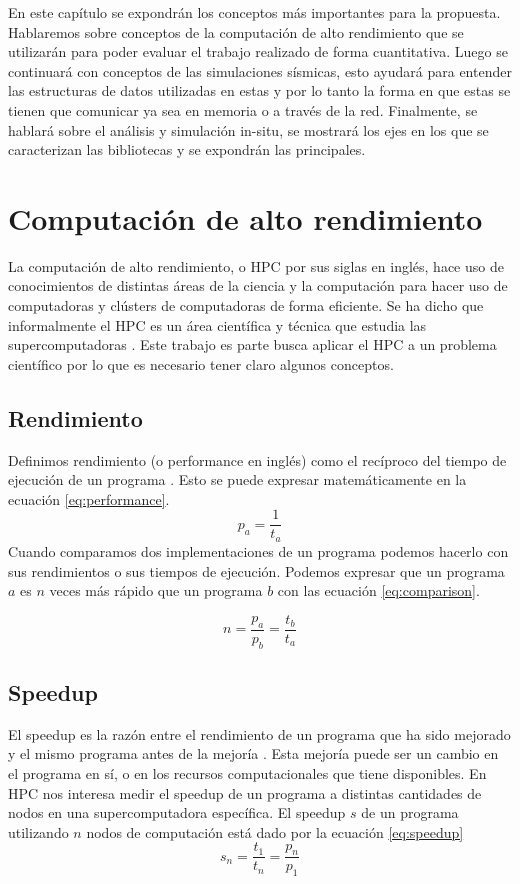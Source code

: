 En este capítulo se expondrán los conceptos más importantes para la propuesta. Hablaremos sobre conceptos de la computación de alto rendimiento que se utilizarán para poder evaluar el trabajo realizado de forma cuantitativa. Luego se continuará con conceptos de las simulaciones sísmicas, esto ayudará para entender las estructuras de datos utilizadas en estas y por lo tanto la forma en que estas se tienen que comunicar ya sea en memoria o a través de la red. Finalmente, se hablará sobre el análisis y simulación in-situ, se mostrará los ejes en los que se caracterizan las bibliotecas y se expondrán las principales.
\section{Computación de alto rendimiento}
La computación de alto rendimiento, o HPC por sus siglas en inglés, hace uso de conocimientos de distintas áreas de la ciencia y la computación para hacer uso de computadoras y clústers de computadoras de forma eficiente. Se ha dicho que informalmente el HPC es un área científica y técnica que estudia las supercomputadoras \cite{Nielsen2016}. Este trabajo es parte busca aplicar el HPC a un problema científico por lo que es necesario tener claro algunos conceptos.
\subsection{Rendimiento}
Definimos rendimiento (o performance en inglés) como el recíproco del tiempo de ejecución de un programa \cite{Hennessy2017-ml}. Esto se puede expresar matemáticamente en la ecuación \ref{eq:performance}.
\begin{equation}
  p_{a} = \frac{1}{t_a}
  \label{eq:performance}
\end{equation}
Cuando comparamos dos implementaciones de un programa podemos hacerlo con sus rendimientos o sus tiempos de ejecución. Podemos expresar que un programa $a$ es $n$ veces más rápido que un programa $b$ con las ecuación \ref{eq:comparison}.

\begin{equation}
  n = \frac{p_a}{p_b} = \frac{t_b}{t_a}
  \label{eq:comparison}
\end{equation}

\subsection{Speedup}
El speedup es la razón entre el rendimiento de un programa que ha sido mejorado y el mismo programa antes de la mejoría \cite{Hennessy2017-ml}. Esta mejoría puede ser un cambio en el programa en sí, o en los recursos computacionales que tiene disponibles.
En HPC nos interesa medir el speedup de un programa a distintas cantidades de nodos en una supercomputadora específica. El speedup $s$ de un programa utilizando $n$ nodos de computación está dado por la ecuación \ref{eq:speedup}
\begin{equation}
  s_n = \frac{t_1}{t_n} = \frac{p_n}{p_1}
  \label{eq:speedup}
\end{equation}
